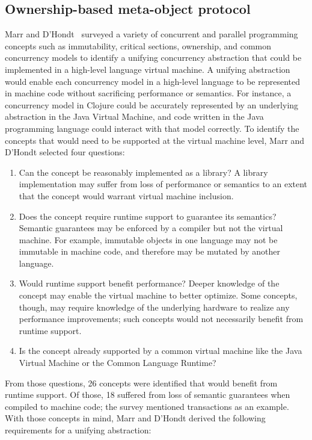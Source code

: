 \documentclass{sig-alternate}
\begin{document}
\subsection{Ownership-based meta-object protocol}

Marr and D'Hondt~\cite{Marr2012} surveyed a variety of concurrent and parallel programming concepts such as immutability, critical sections, ownership, and common concurrency models to identify a unifying concurrency abstraction that could be implemented in a high-level language virtual machine. A unifying abstraction would enable each concurrency model in a high-level language to be represented in machine code without sacrificing performance or semantics. For instance, a concurrency model in Clojure could be accurately represented by an underlying abstraction in the Java Virtual Machine, and code written in the Java programming language could interact with that model correctly. To identify the concepts that would need to be supported at the virtual machine level, Marr and D'Hondt selected four questions:

\begin{enumerate}
  \item Can the concept be reasonably implemented as a library? A library implementation may suffer from loss of performance or semantics to an extent that the concept would warrant virtual machine inclusion.

  \item Does the concept require runtime support to guarantee its semantics? Semantic guarantees may be enforced by a compiler but not the virtual machine. For example, immutable objects in one language may not be immutable in machine code, and therefore may be mutated by another language.

  \item Would runtime support benefit performance? Deeper knowledge of the concept may enable the virtual machine to better optimize. Some concepts, though, may require knowledge of the underlying hardware to realize any performance improvements; such concepts would not necessarily benefit from runtime support.

  \item Is the concept already supported by a common virtual machine like the Java Virtual Machine or the Common Language Runtime?
\end{enumerate}

From those questions, 26 concepts were identified that would benefit from runtime support. Of those, 18 suffered from loss of semantic guarantees when compiled to machine code; the survey mentioned transactions as an example. With those concepts in mind, Marr and D'Hondt derived the following requirements for a unifying abstraction:
\end{document}
